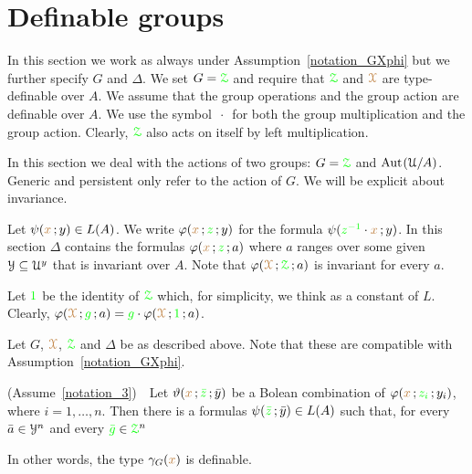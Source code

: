 \section{Definable groups}

In this section we work as always under Assumption~\ref{notation_GXphi} but we further specify $G$ and $\Delta$.
We set $G={\color{green}\EuScript Z}$ and require that ${\color{green}\EuScript Z}$ and ${\color{brown}\EuScript X}$ are type-definable over $A$.
We assume that the group operations and the group action are definable over $A$.
We use the symbol $\,\cdot\,$ for both the group multiplication and the group action.
Clearly, ${\color{green}\EuScript Z}$ also acts on itself by left multiplication.

In this section we deal with the actions of two groups: $G={\color{green}\EuScript Z}$ and ${\rm Aut\kern.15ex}(\EuScript U/A)$.
Generic and persistent only refer to the action of $G$.
We will be explicit about invariance.

Let $\psi({\color{brown} x}\,;y)\in L(A)$.
We write $\varphi({\color{brown} x}\,;{\color{green} z}\,;y)$ for the formula $\psi({\color{green} z^{-1}}\cdot{\color{brown}x}\,;y)$.
In this section $\Delta$ contains the formulas $\varphi({\color{brown} x}\,;{\color{green} z}\,;a)$ where $a$ ranges over some given $\EuScript Y\subseteq\EuScript U^y$ that is invariant over $A$.
Note that $\varphi({\color{brown}\EuScript X}\,;{\color{green}\EuScript Z}\,;a)$ is invariant for every $a$.

Let ${\color{green} 1}$ be the identity of ${\color{green}\EuScript Z}$ which, for simplicity, we think as a constant of $L$.
Clearly, $\varphi({\color{brown}\EuScript X}\,;{\color{green} g}\,;a)={\color{green} g}\cdot\varphi({\color{brown}\EuScript X}\,;{\color{green} 1}\,;a)$.

\begin{assumption}\label{notation_3}
  Let $G$, ${\color{brown}\EuScript X}$, ${\color{green}\EuScript Z}$ and $\Delta$ be as described above.
  Note that these are compatible with Assumption~\ref{notation_GXphi}.
\end{assumption}

\begin{fact}
  (Assume~\ref{notation_3})\ \ 
  Let $\vartheta({\color{brown} x}\,;{\color{green}\bar z}\,;\bar y)$ be a Bolean combination of $\varphi({\color{brown} x}\,;{\color{green} z_i}\,;y_i)$, where $i=1,\dots,n$. 
  Then there is a formulas $\psi({\color{green}\bar z}\,;\bar y)\in L(A)$ such that, for every $\bar a\in\EuScript Y^n$ and every ${\color{green}\bar g}\in{\color{green}\EuScript Z}^n$


  In other words, the type $\gamma_G({\color{brown} x})$ is definable.
\end{fact}

